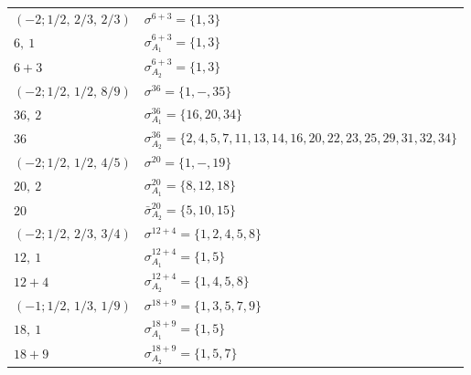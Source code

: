 \documentclass[pdftex]{sigma}
\theoremstyle{definition}
\numberwithin{equation}{section}
\begin{document}
\begin{table}[!t]
\begin{tabular}{|ll|}
\hline
$(-2;1/2,\,2/3,\,2/3) $& $\sigma^{6 + 3} = \{1,3\}$ \\
$6,\ 1$& $\sigma_{A_{1}}^{6 + 3} = \{1,3\}$ \\
$6 + 3$ & $\sigma_{A_{2}}^{6 + 3} = \{1,3\}$ \\
\hline
$(-2;1/2,\,1/2,\,8/9) $& $\sigma^{36} = \{1,-,35\}$ \\
$36,\ 2$& $\sigma_{A_{1}}^{36} = \{16,20,34\}$ \\
$36$ & $\sigma_{A_{2}}^{36} = \{2,4,5,7,11,13,14,16,20,22,23,25,29,31,32,34\}$ \\
\hline
$(-2;1/2,\,1/2,\,4/5) $& $\sigma^{20} = \{1,-,19\}$ \\
$20,\ 2$& $\sigma_{A_{1}}^{20} = \{8,12,18\}$ \\
$20$ & $\bar\sigma_{A_{2}}^{20} = \{5,10,15\}$ \\
\hline
$(-2;1/2,\,2/3,\,3/4) $& $\sigma^{12 + 4} = \{1,2,4,5,8\}$ \\
$12,\ 1$& $\sigma_{A_{1}}^{12 + 4} = \{1,5\}$ \\
$12 + 4$ & $\sigma_{A_{2}}^{12 + 4} = \{1,4,5,8\}$ \\
\hline
$(-1;1/2,\,1/3,\,1/9) $& $\sigma^{18 + 9} = \{1,3,5,7,9\}$ \\
$18,\ 1$& $\sigma_{A_{1}}^{18 + 9} = \{1,5\}$ \\
$18 + 9$ & $\sigma_{A_{2}}^{18 + 9} = \{1,5,7\}$ \\
\hline
\end{tabular}
\end{table}
\end{document}
